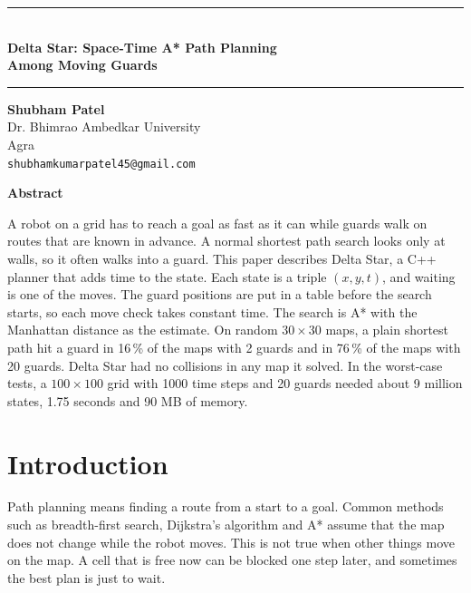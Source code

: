 \documentclass[10pt,letterpaper]{article}
\renewcommand{\thefootnote}{\fnsymbol{footnote}}
\newcommand{\papertitle}{Delta Star: Space-Time A* Path Planning\\Among Moving Guards}
\begin{document}
\thispagestyle{empty}
\begin{center}
\rule{\textwidth}{4pt}\\[10pt]
{\Large\bfseries \papertitle}\\[8pt]
\rule{\textwidth}{1pt}

\vspace{14pt}
{\bfseries Shubham Patel}\\[2pt]
Dr. Bhimrao Ambedkar University\\
Agra\\
\texttt{shubhamkumarpatel45@gmail.com}
\end{center}

\vspace{10pt}
\begin{center}
{\large\bfseries Abstract}
\end{center}
\begin{list}{}{\setlength{\leftmargin}{0.5in}\setlength{\rightmargin}{0.5in}\setlength{\topsep}{0pt}}
\item
A robot on a grid has to reach a goal as fast as it can while guards walk on routes that are known in advance. A normal shortest path search looks only at walls, so it often walks into a guard. This paper describes Delta Star, a C++ planner that adds time to the state. Each state is a triple $(x, y, t)$, and waiting is one of the moves. The guard positions are put in a table before the search starts, so each move check takes constant time. The search is A* with the Manhattan distance as the estimate. On random $30 \times 30$ maps, a plain shortest path hit a guard in 16\,\% of the maps with 2 guards and in 76\,\% of the maps with 20 guards. Delta Star had no collisions in any map it solved. In the worst-case tests, a $100 \times 100$ grid with 1000 time steps and 20 guards needed about 9 million states, 1.75 seconds and 90 MB of memory.
\end{list}

\renewcommand{\thefootnote}{\arabic{footnote}}

\section{Introduction}

Path planning means finding a route from a start to a goal. Common methods such as breadth-first search, Dijkstra's algorithm \cite{dijkstra1959} and A* \cite{hart1968,wiki_astar} assume that the map does not change while the robot moves. This is not true when other things move on the map. A cell that is free now can be blocked one step later, and sometimes the best plan is just to wait.
\end{document}
